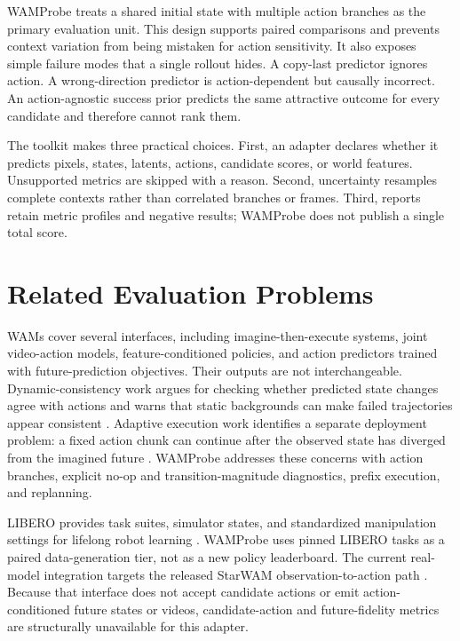 \documentclass[10pt]{article}
\begin{document}
WAMProbe treats a shared initial state with multiple action branches as the primary
evaluation unit. This design supports paired comparisons and prevents context variation
from being mistaken for action sensitivity. It also exposes simple failure modes that a
single rollout hides. A copy-last predictor ignores action. A wrong-direction predictor
is action-dependent but causally incorrect. An action-agnostic success prior predicts the
same attractive outcome for every candidate and therefore cannot rank them.

The toolkit makes three practical choices. First, an adapter declares whether it predicts
pixels, states, latents, actions, candidate scores, or world features. Unsupported metrics
are skipped with a reason. Second, uncertainty resamples complete contexts rather than
correlated branches or frames. Third, reports retain metric profiles and negative results;
WAMProbe does not publish a single total score.

\section{Related Evaluation Problems}

WAMs cover several interfaces, including imagine-then-execute systems, joint video-action
models, feature-conditioned policies, and action predictors trained with future-prediction
objectives. Their outputs are not interchangeable. Dynamic-consistency work argues for
checking whether predicted state changes agree with actions and warns that static
backgrounds can make failed trajectories appear consistent \cite{ruan2026compatible}.
Adaptive execution work identifies a separate deployment problem: a fixed action chunk
can continue after the observed state has diverged from the imagined future
\cite{wang2026trust}. WAMProbe addresses these concerns with action branches, explicit
no-op and transition-magnitude diagnostics, prefix execution, and replanning.

LIBERO provides task suites, simulator states, and standardized manipulation settings for
lifelong robot learning \cite{liu2023libero}. WAMProbe uses pinned LIBERO tasks as a paired
data-generation tier, not as a new policy leaderboard. The current real-model integration
targets the released StarWAM observation-to-action path \cite{pan2026starwam}. Because
that interface does not accept candidate actions or emit action-conditioned future states
or videos, candidate-action and future-fidelity metrics are structurally unavailable for
this adapter.
\end{document}

